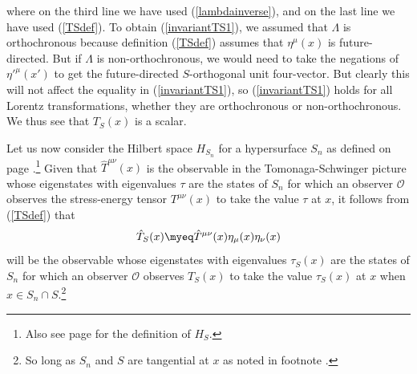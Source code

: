 \documentclass[12pt]{report}
\begin{document}
where on the third line we have used (\ref{lambdainverse}), and on the last line we have used (\ref{TSdef}). To obtain (\ref{invariantTS1}), we assumed that $\Lambda$ is orthochronous because definition (\ref{TSdef}) assumes that $\eta^\mu(x)$ is future-directed. But if $\Lambda$ is non-orthochronous, we would need to take the negations of ${\eta'}^\mu(x')$ to get the future-directed $S$-orthogonal unit four-vector. But clearly this will not affect the equality in (\ref{invariantTS1}), so (\ref{invariantTS1}) holds for all Lorentz transformations, whether they are orthochronous or non-orthochronous.  We thus see that   $T_S(x)$ is a scalar.

Let us now consider the Hilbert space $H_{S_n}$  for a hypersurface $S_n$ as defined on page \pageref{HSidef}.\footnote{Also see page \pageref{HSdef} for the definition of $H_S$.} 
Given that $\hat{T}^{\mu\nu}(x)$ is the observable in the Tomonaga-Schwinger picture whose eigenstates with eigenvalues $\tau$ are the states of $S_n$ for which an observer $\mathcal{O}$ observes the stress-energy tensor $T^{\mu\nu}(x)$ to take the value $\tau$ at $x$, it follows from (\ref{TSdef}) that 
\begin{equation}\label{TShat}
	\hat{T}_S(x)\myeq \hat{T}^{\mu\nu}(x)\eta_{\mu}(x)\eta_{\nu}(x)
	\end{equation}
will %
%
 be the observable whose eigenstates with eigenvalues $\tau_S(x)$ are the states of $S_n$ for which an observer $\mathcal{O}$ observes $T_S(x)$ to take the value $\tau_S(x)$ at $x$ when $x\in S_n\cap S$.\footnote{So long as $S_n$ and $S$ are tangential at $x$ as noted in footnote .}
 
\end{document}
